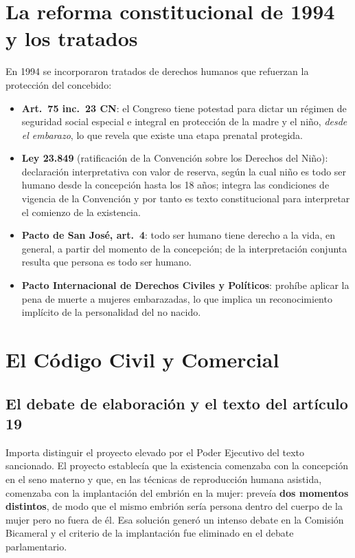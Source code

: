 \documentclass[12pt,oneside]{book}
\begin{document}
\section{La reforma constitucional de 1994 y los tratados}

En 1994 se incorporaron tratados de derechos humanos que refuerzan la protección del concebido:

\begin{itemize}
\item \textbf{Art.~75 inc.~23 CN}: el Congreso tiene potestad para dictar un régimen de seguridad social especial e integral en protección de la madre y el niño, \emph{desde el embarazo}, lo que revela que existe una etapa prenatal protegida.
\item \textbf{Ley 23.849} (ratificación de la Convención sobre los Derechos del Niño): declaración interpretativa con valor de reserva, según la cual niño es todo ser humano desde la concepción hasta los 18 años; integra las condiciones de vigencia de la Convención y por tanto es texto constitucional para interpretar el comienzo de la existencia.
\item \textbf{Pacto de San José, art.~4}: todo ser humano tiene derecho a la vida, en general, a partir del momento de la concepción; de la interpretación conjunta resulta que persona es todo ser humano.
\item \textbf{Pacto Internacional de Derechos Civiles y Políticos}: prohíbe aplicar la pena de muerte a mujeres embarazadas, lo que implica un reconocimiento implícito de la personalidad del no nacido.
\end{itemize}

\section{El Código Civil y Comercial}

\subsection{El debate de elaboración y el texto del artículo 19}

Importa distinguir el proyecto elevado por el Poder Ejecutivo del texto sancionado. El proyecto establecía que la existencia comenzaba con la concepción en el seno materno y que, en las técnicas de reproducción humana asistida, comenzaba con la implantación del embrión en la mujer: preveía \textbf{dos momentos distintos}, de modo que el mismo embrión sería persona dentro del cuerpo de la mujer pero no fuera de él. Esa solución generó un intenso debate en la Comisión Bicameral y el criterio de la implantación fue eliminado en el debate parlamentario.
\end{document}
